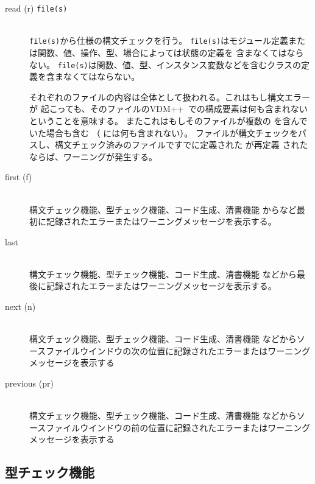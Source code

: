 \documentclass[\pformat,12pt]{jarticle}
\newcommand{\vdmslpp}{VDM++}
\begin{document}
\begin{description}

\item[read (r) {\tt file(s)}] \mbox{}\\
  {\tt file(s)}から仕様の構文チェックを行う。
    {
      {\tt file(s)}はモジュール定義または関数、値、操作、型、場合によっては状態の定義を
      含まなくてはならない。
    }%
    {
      {\tt file(s)}は関数、値、型、インスタンス変数などを含むクラスの定義を含まなくてはならない。
    }

  それぞれのファイルの内容は全体として扱われる。これはもし構文エラーが
  起こっても、そのファイルの\vdmslpp\ での構成要素は何も含まれないということを意味する。
  またこれはもしそのファイルが複数の
   を含んでいた場合も含む
  （  には何も含まれない）。
  ファイルが構文チェックをパスし、構文チェック済みのファイルですでに定義された
   が再定義
  されたならば、ワーニングが発生する。

\item[first (f)] \mbox{}\\
  構文チェック機能、型チェック機能、コード生成、清書機能
  からなど最初に記録されたエラーまたはワーニングメッセージを表示する。

\item[last] \mbox{}\\
  構文チェック機能、型チェック機能、コード生成、清書機能
  などから最後に記録されたエラーまたはワーニングメッセージを表示する。

\item[next (n) ]\mbox{}\\
  構文チェック機能、型チェック機能、コード生成、清書機能
  などからソースファイルウインドウの次の位置に記録されたエラーまたはワーニングメッセージを表示する

\item[previous (pr)] \mbox{}\\
  構文チェック機能、型チェック機能、コード生成、清書機能
  などからソースファイルウインドウの前の位置に記録されたエラーまたはワーニングメッセージを表示する

\end{description}

\newpage
\subsection{型チェック機能}\label{sec:tc}
\label{sec:def-typechedk}\label{type check} 
\end{document}
